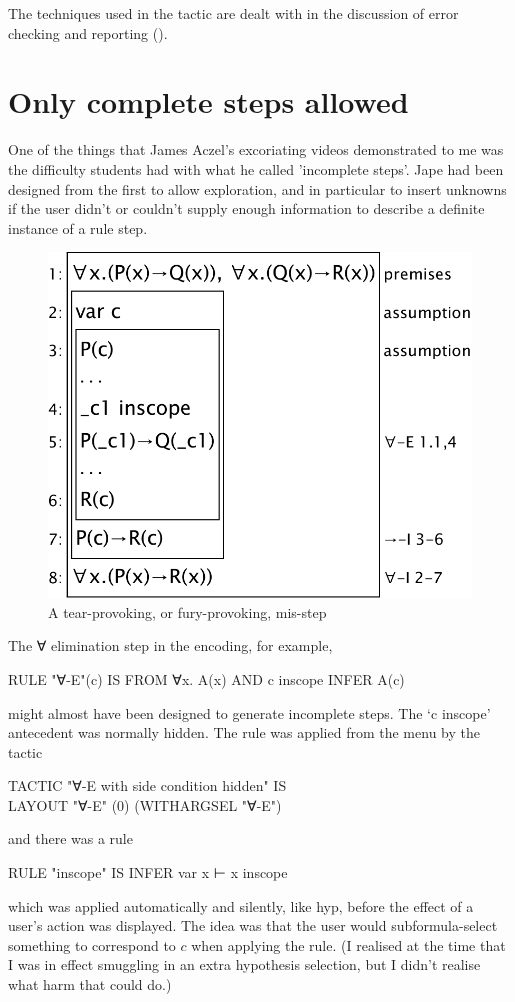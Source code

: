 The techniques used in the tactic are dealt with in the discussion of error checking and reporting ().

\section{Only complete steps allowed}

One of the things that James Aczel's excoriating videos demonstrated to me was the difficulty students had with what he called 'incomplete steps'. Jape had been designed from the first to allow exploration, and in particular to insert unknowns if the user didn't or couldn't supply enough information to describe a definite instance of a rule step. 

\begin{figure}
\centering
\includegraphics[scale=0.5]{pics/I2L/tearprovocation}
\caption{A tear-provoking, or fury-provoking, mis-step}
\label{fig:I2L:tearprovocation}
\end{figure}

The ∀ elimination step in the   encoding, for example,
\begin{japeish}
RULE "∀-E"(c) IS FROM ∀x. A(x) AND c inscope INFER A(c)
\end{japeish}
might almost have been designed to generate incomplete steps. The `c inscope' antecedent was normally hidden. The rule was applied from the menu by the tactic
\begin{japeish}
TACTIC "∀-E with side condition hidden" IS \\
\tab LAYOUT "∀-E" (0) (WITHARGSEL "∀-E")
\end{japeish}
and there was a rule
\begin{japeish}
RULE "inscope" IS INFER var x ⊢ x inscope
\end{japeish}
which was applied automatically and silently, like hyp, before the effect of a user's action was displayed. The idea was that the user would subformula-select something to correspond to $c$ when applying the rule. (I realised at the time that I was in effect smuggling in an extra hypothesis selection, but I didn't realise what harm that could do.)

